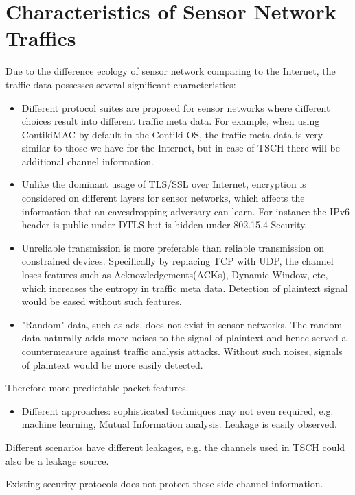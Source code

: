 \section{Characteristics of Sensor Network Traffics}

Due to the difference ecology of sensor network comparing to the Internet, the traffic data possesses several significant characteristics:

\begin{itemize}
	\item Different protocol suites are proposed for sensor networks where different choices result into different traffic meta data. For example, when using ContikiMAC\cite{ContikiMAC} by default in the Contiki OS, the traffic meta data is very similar to those we have for the Internet, but in case of TSCH\cite{rfc7554} there will be additional channel information. 
	\item Unlike the dominant usage of TLS/SSL over Internet, encryption is considered on different layers for sensor networks, which affects the information that an eavesdropping adversary can learn. For instance the IPv6 header is public under DTLS\cite{rfc6347} but is hidden under 802.15.4 Security\cite{802154}.
	\item Unreliable transmission is more preferable than reliable transmission on constrained devices. Specifically by replacing TCP with UDP, the channel loses features such as Acknowledgements(ACKs), Dynamic Window, etc, which increases the entropy in traffic meta data. Detection of plaintext signal would be eased without such features.
	\item "Random" data, such as ads, does not exist in sensor networks. The random data naturally adds more noises to the signal of plaintext and hence served a countermeasure against traffic analysis attacks. Without such noises, signals of plaintext would be more easily detected.
\end{itemize}

Therefore more predictable packet features.

\begin{itemize}
	\item Different approaches: sophisticated techniques may not even required, e.g. machine learning, Mutual Information analysis. Leakage is easily observed.
\end{itemize}

Different scenarios have different leakages, e.g. the channels used in  TSCH could also be a leakage source.

Existing security protocols does not protect these side channel information.
